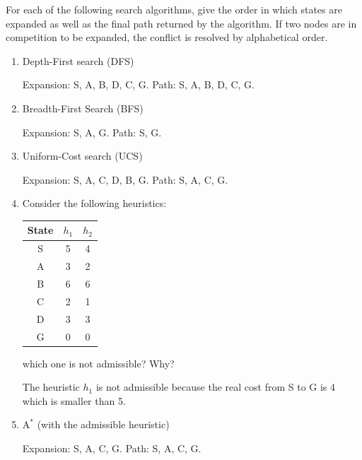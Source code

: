 \documentclass[11pt, a4paper]{article}
\def\Astar{$\text{A}^*$}
\begin{document}
For each of the following search algorithms, give the order in which states are expanded as well as the final path returned by the algorithm. If two nodes are in competition to be expanded, the conflict is resolved by alphabetical order.

\begin{enumerate}
    \item Depth-First search (DFS)

    \begin{solution}
        Expansion: S, A, B, D, C, G. Path: S, A, B, D, C, G.
    \end{solution}

    \item Breadth-First Search (BFS)

    \begin{solution}
        Expansion: S, A, G. Path: S, G.
    \end{solution}

    \item Uniform-Cost search (UCS)

    \begin{solution}
        Expansion: S, A, C, D, B, G. Path: S, A, C, G.
    \end{solution}

    \item Consider the following heuristics:
    \begin{table}[h]
        \centering
        \begin{tabular}{c|cc}
            \toprule
            State & $h_1$ & $h_2$ \\
            \midrule
            S & 5 & 4\\
            A & 3 & 2\\
            B & 6 & 6\\
            C & 2 & 1\\
            D & 3 & 3\\
            G & 0 & 0\\
            \bottomrule
        \end{tabular}
    \end{table}
    which one is not admissible? Why?

    \begin{solution}
        The heuristic $h_1$ is not admissible because the real cost from S to G is 4 which is smaller than 5.
    \end{solution}

    \item \Astar{} (with the admissible heuristic)

    \begin{solution}
        Expansion: S, A, C, G. Path: S, A, C, G.
    \end{solution}
\end{enumerate}
\end{document}
